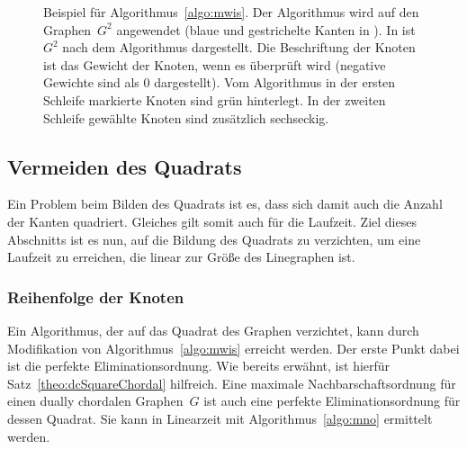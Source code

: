 \begin{figure}[htbp]
{\begin{tikzpicture}
    \end{tikzpicture}}
%        
%        
%            
    \caption[Beispiel für Algorithmus~\ref{algo:mwis}]{Beispiel für Algorithmus~\ref{algo:mwis}. Der Algorithmus wird auf den Graphen~$G^2$ angewendet (blaue und gestrichelte Kanten in ). In  ist $G^2$ nach dem Algorithmus dargestellt. Die Beschriftung der Knoten ist das Gewicht der Knoten, wenn es überprüft wird (negative Gewichte sind als $0$ dargestellt). Vom Algorithmus in der ersten Schleife markierte Knoten sind grün hinterlegt. In der zweiten Schleife gewählte Knoten sind zusätzlich sechseckig. }
    \label{pic:bsp_Algo_mwIS}
\end{figure}


\subsection{Vermeiden des Quadrats}\label{sec:VermeidenDesQuadrats}
Ein Problem beim Bilden des Quadrats ist es, dass sich damit auch die Anzahl der Kanten quadriert. Gleiches gilt somit auch für die Laufzeit. Ziel dieses Abschnitts ist es nun, auf die Bildung des Quadrats zu verzichten, um eine Laufzeit zu erreichen, die linear zur Größe des Linegraphen ist.

\subsubsection{Reihenfolge der Knoten}
Ein Algorithmus, der auf das Quadrat des Graphen verzichtet, kann durch Modifikation von Algorithmus~\ref{algo:mwis} erreicht werden. Der erste Punkt dabei ist die perfekte Eliminationsordnung. Wie bereits erwähnt, ist hierfür Satz~\ref{theo:dcSquareChordal} hilfreich. Eine maximale Nachbarschaftsordnung für einen dually chordalen Graphen~$G$ ist auch eine perfekte Eliminationsordnung für dessen Quadrat. Sie kann in Linearzeit mit Algorithmus~\ref{algo:mno} ermittelt werden.

